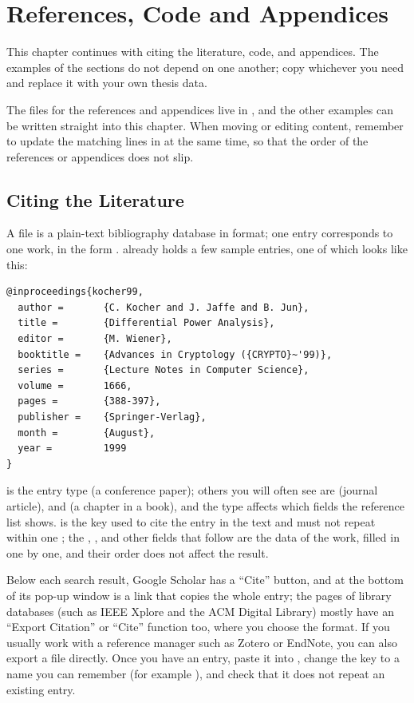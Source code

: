 \chapter{References, Code and Appendices}\label{cha:refs}

This chapter continues with citing the literature, code, and appendices. The examples of the sections do not depend on one another; copy whichever you need and replace it with your own thesis data.

The files for the references and appendices live in , and the other examples can be written straight into this chapter. When moving or editing content, remember to update the matching lines in  at the same time, so that the order of the references or appendices does not slip.

\section{Citing the Literature}

A  file is a plain-text bibliography database in \BibTeX{} format; one entry corresponds to one work, in the form .  already holds a few sample entries, one of which looks like this:

\begin{lstlisting}
@inproceedings{kocher99,
  author =       {C. Kocher and J. Jaffe and B. Jun},
  title =        {Differential Power Analysis},
  editor =       {M. Wiener},
  booktitle =    {Advances in Cryptology ({CRYPTO}~'99)},
  series =       {Lecture Notes in Computer Science},
  volume =       1666,
  pages =        {388-397},
  publisher =    {Springer-Verlag},
  month =        {August},
  year =         1999
}
\end{lstlisting}

 is the entry type (a conference paper); others you will often see are  (journal article),  and  (a chapter in a book), and the type affects which fields the reference list shows.  is the key used to cite the entry in the text and must not repeat within one ; the , ,  and other fields that follow are the data of the work, filled in one by one, and their order does not affect the result.

Below each search result, Google Scholar has a ``Cite'' button, and at the bottom of its pop-up window is a \BibTeX{} link that copies the whole entry; the pages of library databases (such as IEEE Xplore and the ACM Digital Library) mostly have an ``Export Citation'' or ``Cite'' function too, where you choose the \BibTeX{} format. If you usually work with a reference manager such as Zotero or EndNote, you can also export a  file directly. Once you have an entry, paste it into , change the key to a name you can remember (for example ), and check that it does not repeat an existing entry.

